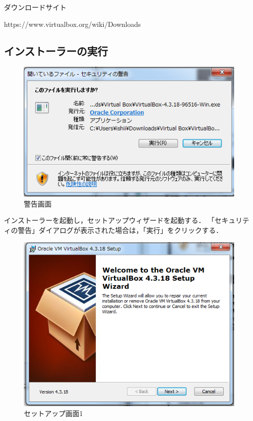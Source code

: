 ダウンロードサイト

https://www.virtualbox.org/wiki/Downloads


\subsection{インストーラーの実行}

\begin{figure}[H]
\centering
\includegraphics[width=13cm]{VBcaveat.png}
\caption{警告画面}\label{サンプル図}
\end{figure}

インストーラーを起動し，セットアップウィザードを起動する．
「セキュリティの警告」ダイアログが表示された場合は，「実行」をクリックする．


\begin{figure}[H]
\centering
\includegraphics[width=13cm]{VBsetup.png}
\caption{セットアップ画面1}\label{サンプル図}
\end{figure}

